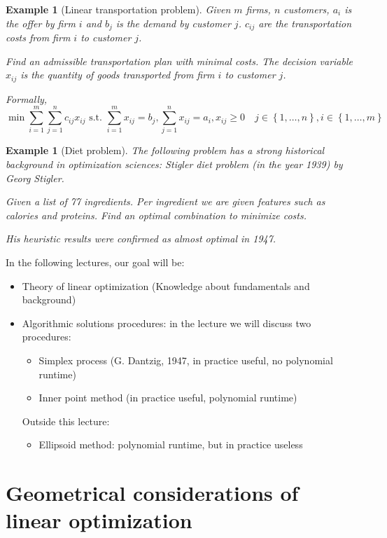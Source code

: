 \documentclass[a4paper]{article}
\numberwithin{lecref}{section}
\newcounter{exercises}
\newtheorem{example}[exercises]{Example}
\newtheorem*{Example}{Example}
\newcommand{\Set}[1]{\left\{#1\right\}}
\begin{document}
\begin{example}[Linear transportation problem]
  \label{example:3}
  Given $m$ firms, $n$ customers, $a_i$ is the offer by firm $i$ and $b_j$ is the demand by customer $j$.
  $c_{ij}$ are the transportation costs from firm $i$ to customer $j$.

  Find an admissible transportation plan with minimal costs.
  The decision variable $x_{ij}$ is the quantity of goods transported from firm $i$ to customer $j$.

  Formally,
  \[ \min{\sum_{i=1}^m \sum_{j=1}^n c_{ij} x_{ij}} \text{ s.t. } \sum_{i=1}^m x_{ij} = b_j, \sum_{j=1}^n x_{ij} = a_i, x_{ij} \geq 0 \quad j \in \Set{1, \dots, n}, i \in \Set{1, \dots, m} \]
\end{example}

\begin{Example}[Diet problem]
  The following problem has a strong historical background in optimization sciences:
  Stigler diet problem (in the year 1939) by Georg Stigler. 

  Given a list of 77 ingredients. Per ingredient we are given features such as calories and proteins.
  Find an optimal combination to minimize costs.

  His heuristic results were confirmed as almost optimal in 1947.
\end{Example}

In the following lectures, our goal will be:

\begin{itemize}
	\item Theory of linear optimization (Knowledge about fundamentals and background)
	\item Algorithmic solutions procedures: in the lecture we will discuss two procedures:
		\begin{itemize}
			\item Simplex process (G. Dantzig, 1947, in practice useful, no polynomial runtime)
			\item Inner point method (in practice useful, polynomial runtime)
		\end{itemize}
		Outside this lecture:
		\begin{itemize}
			\item Ellipsoid method: polynomial runtime, but in practice useless
		\end{itemize}
\end{itemize}

\section{Geometrical considerations of linear optimization}
\end{document}
